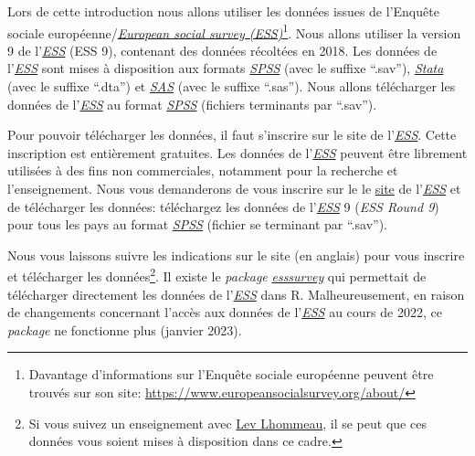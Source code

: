 \documentclass[
]{book}
\begin{document}
Lors de cette introduction nous allons utiliser les données issues de l'Enquête sociale européenne/\href{https://www.europeansocialsurvey.org/}{\emph{European social survey (ESS)}}\footnote{Davantage d'informations sur l'Enquête sociale européenne peuvent être trouvés sur son site: \url{https://www.europeansocialsurvey.org/about/}}. Nous allons utiliser la version 9 de l'\href{https://www.europeansocialsurvey.org/}{\emph{ESS}} (ESS 9), contenant des données récoltées en 2018. Les données de l'\href{https://www.europeansocialsurvey.org/}{\emph{ESS}} sont mises à disposition aux formats \href{https://www.ibm.com/fr-fr/products/spss-statistics}{\emph{SPSS}} (avec le suffixe ``.sav''), \href{https://www.stata.com/}{\emph{Stata}} (avec le suffixe ``.dta'') et \href{https://www.sas.com/}{\emph{SAS}} (avec le suffixe ``.sas''). Nous allons télécharger les données de l'\href{https://www.europeansocialsurvey.org/}{\emph{ESS}} au format \href{https://www.ibm.com/fr-fr/products/spss-statistics}{\emph{SPSS}} (fichiers terminants par ``.sav'').

Pour pouvoir télécharger les données, il faut s'inscrire sur le site de l'\href{https://www.europeansocialsurvey.org/}{\emph{ESS}}. Cette inscription est entièrement gratuites. Les données de l'\href{https://www.europeansocialsurvey.org/}{\emph{ESS}} peuvent être librement utilisées à des fins non commerciales, notamment pour la recherche et l'enseignement. Nous vous demanderons de vous inscrire sur le le \href{https://www.europeansocialsurvey.org/}{site} de l'\href{https://www.europeansocialsurvey.org/}{\emph{ESS}} et de télécharger les données: téléchargez les données de l'\href{https://www.europeansocialsurvey.org/}{\emph{ESS}} 9 (\emph{ESS Round 9}) pour tous les pays au format \href{https://www.ibm.com/fr-fr/products/spss-statistics}{\emph{SPSS}} (fichier se terminant par ``.sav'').

Nous vous laissons suivre les indications sur le site (en anglais) pour vous inscrire et télécharger les données\footnote{Si vous suivez un enseignement avec \href{mailto:lhommeau@gmail.com}{Lev Lhommeau}, il se peut que ces données vous soient mises à disposition dans ce cadre.}. Il existe le \emph{package} \href{https://cran.r-project.org/web/packages/essurvey/vignettes/intro_ess.html}{\emph{esssurvey}} qui permettait de télécharger directement les données de l'\href{https://www.europeansocialsurvey.org/}{\emph{ESS}} dans R. Malheureusement, en raison de changements concernant l'accès aux données de l'\href{https://www.europeansocialsurvey.org/}{\emph{ESS}} au cours de 2022, ce \emph{package} ne fonctionne plus (janvier 2023).
\end{document}
